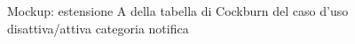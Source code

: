 \begin{figure}[ht]
    \caption{Mockup: estensione A della tabella di Cockburn del caso d'uso disattiva/attiva categoria notifica}
    \label{fig:tikz_flow}
\end{figure}

\newpage

